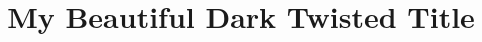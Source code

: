 \documentclass{acm_proc_article-sp}
\begin{document}
\title{My Beautiful Dark Twisted Title}
%
%
%
%
%
\end{document}
